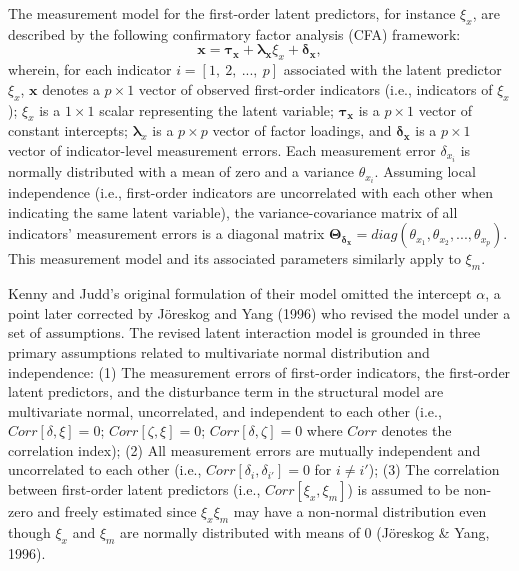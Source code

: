 \documentclass[
  man]{apa6}
\begin{document}
The measurement model for the first-order latent predictors, for instance \(\xi_{x}\), are described by the following confirmatory factor analysis (CFA) framework:
\begin{equation}
\mathbf{x} = \boldsymbol{\tau_{x}} + \boldsymbol{\lambda_{x}}\xi_{x} + \boldsymbol{\delta_{x}},
\end{equation}
wherein, for each indicator \(i = [1, \ 2, \ ..., \ p]\) associated with the latent predictor \(\xi_{x}\), \(\mathbf{x}\) denotes a \(p \times 1\) vector of observed first-order indicators (i.e., indicators of \(\xi_{x}\)); \(\xi_{x}\) is a \(1 \times 1\) scalar representing the latent variable; \(\boldsymbol{{\tau_{x}}}\) is a \(p \times 1\) vector of constant intercepts; \(\boldsymbol{\lambda}_{x}\) is a \(p \times p\) vector of factor loadings, and \(\boldsymbol{\delta_{x}}\) is a \(p \times 1\) vector of indicator-level measurement errors. Each measurement error \(\delta_{x_{i}}\) is normally distributed with a mean of zero and a variance \(\theta_{x_{i}}\). Assuming local independence (i.e., first-order indicators are uncorrelated with each other when indicating the same latent variable), the variance-covariance matrix of all indicators' measurement errors is a diagonal matrix \(\mathbf{\Theta_{\delta_{x}}} = diag(\theta_{x_{1}}, \theta_{x_{2}}, ..., \theta_{x_{p}})\). This measurement model and its associated parameters similarly apply to \(\xi_{m}\).

Kenny and Judd's original formulation of their model omitted the intercept \(\alpha\), a point later corrected by Jöreskog and Yang (1996) who revised the model under a set of assumptions. The revised latent interaction model is grounded in three primary assumptions related to multivariate normal distribution and independence: (1) The measurement errors of first-order indicators, the first-order latent predictors, and the disturbance term in the structural model are multivariate normal, uncorrelated, and independent to each other (i.e., \(Corr[\delta, \xi] = 0\); \(Corr[\zeta, \xi] = 0\); \(Corr[\delta, \zeta] = 0\) where \(Corr\) denotes the correlation index); (2) All measurement errors are mutually independent and uncorrelated to each other (i.e., \(Corr[\delta_{i}, \delta_{i'}] = 0\) for \(i \neq i'\)); (3) The correlation between first-order latent predictors (i.e., \(Corr[\xi_{x}, \xi_{m}]\)) is assumed to be non-zero and freely estimated since \(\xi_{x}\xi_{m}\) may have a non-normal distribution even though \(\xi_{x}\) and \(\xi_{m}\) are normally distributed with means of 0 (Jöreskog \& Yang, 1996).
\end{document}
